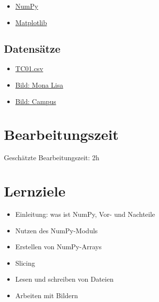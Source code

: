 \documentclass[
  letterpaper,
  DIV=11,
  numbers=noendperiod]{scrreprt}
\providecommand{\tightlist}{%
  \setlength{\itemsep}{0pt}\setlength{\parskip}{0pt}}\usepackage{longtable,booktabs,array}
\begin{document}
\begin{itemize}
\tightlist
\item
  \href{https://numpy.org/}{NumPy}
\item
  \href{https://matplotlib.org/}{Matplotlib}
\end{itemize}

\subsection*{Datensätze}\label{datensuxe4tze}

\begin{itemize}
\tightlist
\item
  \href{https://firedynamics.github.io/LectureComputerScience/_downloads/0d1a3bfbc82fa134e08585d6151e9f46/TC01.csv}{TC01.csv}
\item
  \href{https://upload.wikimedia.org/wikipedia/commons/thumb/6/6a/Mona_Lisa.jpg/677px-Mona_Lisa.jpg}{Bild:
  Mona Lisa}
\item
  \href{https://firedynamics.github.io/LectureComputerScience/_downloads/592f1fc843fc7c01bdcad17bf85ec15c/campus_haspel.jpeg}{Bild:
  Campus}
\end{itemize}

\section*{Bearbeitungszeit}\label{bearbeitungszeit-1}


Geschätzte Bearbeitungszeit: 2h

\section*{Lernziele}\label{lernziele-2}


\begin{itemize}
\tightlist
\item
  Einleitung: was ist NumPy, Vor- und Nachteile
\item
  Nutzen des NumPy-Moduls
\item
  Erstellen von NumPy-Arrays
\item
  Slicing
\item
  Lesen und schreiben von Dateien
\item
  Arbeiten mit Bildern
\end{itemize}
\end{document}
